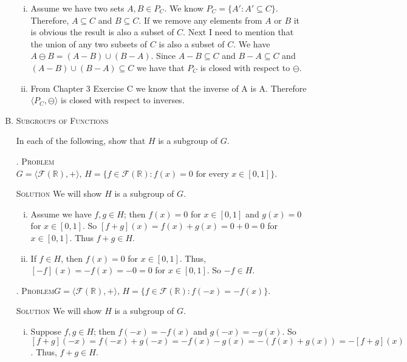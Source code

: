 \documentclass[twoside]{amsart}
\newcommand{\solution}{\textsc{Solution}\xspace}
\newcommand{\problem}{\textsc{Problem}\xspace}
\begin{document}
\begin{enumerate}[A.]
   \begin{enumerate}[(i)]
      \item Assume we have two sets $A,B \in P_C$. We know $P_C = \{ A' : A'
      \subseteq C\}$. Therefore, $A \subseteq C$ and $B \subseteq C$. If we
      remove any elements from $A$ or $B$ it is obvious the result is also a
      subset of $C$. Next I need to mention that the union of any two subsets
      of $C$ is also a subset of $C$.  We have $A \ominus B = (A - B) \cup (B -
      A)$. Since $A-B\subseteq C$ and $B-A\subseteq C$ and $(A-B)\cup (B-A)
      \subseteq C$ we have that $P_C$ is closed with respect to $\ominus$.


      \item From Chapter 3 Exercise C we know that the inverse of A is A. 
      Therefore $\langle P_C, \ominus \rangle$ is closed with respect
      to inverses.
   \end{enumerate}

   \item \textsc{Subgroups of Functions}

   \noindent In each of the following, show that $H$ is a subgroup of $G$.

   . \problem $G = \langle \mathcal{F}(\mathbb{R}), + \rangle,\, H=
   \{ f \in \mathcal{F}(\mathbb{R}) : f(x) = 0 \text{ for every } 
   x \in [0,1]\}$.

   \noindent \solution We will show $H$ is a subgroup of $G$.
   
   \begin{enumerate}[(i)]
      \item Assume we have $f,g \in H$; then $f(x) = 0$ for $x \in [0,1]$ and
      $g(x) = 0$ for $x \in [0,1]$. So $[f+g](x) = f(x) + g(x) = 0 + 0 = 0$ for
      $x \in [0,1]$. Thus $f+g \in H$.

      \item If $f \in H$, then $f(x) = 0$ for $x \in [0,1]$. Thus,
      $[-f](x)=-f(x)=-0=0$ for $x \in [0,1]$. So $-f \in H$.

   \end{enumerate}

   . \problem $G = \langle \mathcal{F}(\mathbb{R}), + \rangle,\, H =
   \{ f \in \mathcal{F}(\mathbb{R}) : f(-x) = -f(x)\}$.

   \noindent \solution We will show $H$ is a subgroup of $G$.

   \begin{enumerate}[(i)]
      \item Suppose $f,g\in H$; then $f(-x) = -f(x)$ and $g(-x) = -g(x)$.
      So $[f+g](-x) = f(-x) + g(-x) = -f(x) - g(x) = -(f(x) + g(x)) = 
      - [f+g](x)$. Thus, $f+g\in H$.


\end{enumerate}
\end{enumerate}
\end{document}

